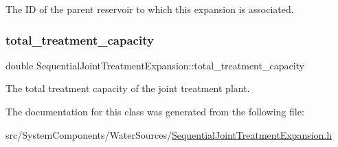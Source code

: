 The ID of the parent reservoir to which this expansion is associated. 

\mbox{\label{classSequentialJointTreatmentExpansion_a35db39c86948882acbc30fe970f55d52}} 
\subsubsection{\texorpdfstring{total\+\_\+treatment\+\_\+capacity}{total\_treatment\_capacity}}
{\footnotesize\ttfamily double Sequential\+Joint\+Treatment\+Expansion\+::total\+\_\+treatment\+\_\+capacity\hspace{0.3cm}{\ttfamily [private]}}



The total treatment capacity of the joint treatment plant. 



The documentation for this class was generated from the following file\+:\begin{DoxyCompactItemize}
\item 
src/\+System\+Components/\+Water\+Sources/\mbox{\hyperlink{SequentialJointTreatmentExpansion_8h}{Sequential\+Joint\+Treatment\+Expansion.\+h}}\end{DoxyCompactItemize}
